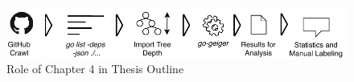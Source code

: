 \begin{figure}[ht]
    \includegraphics[width=\textwidth]{assets/figures/chapter4/outline.pdf}
    \caption{Role of Chapter 4 in Thesis Outline}
    \label{fig:outline4}
\end{figure}
